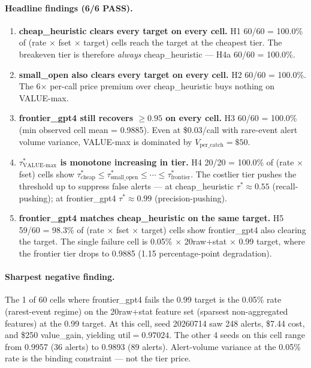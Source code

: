 \documentclass{article}
\begin{document}
\paragraph{Headline findings (6/6 PASS).}
\begin{enumerate}
\item \textbf{cheap\_heuristic clears every target on every cell.}
H1 60/60 = 100.0\% of (rate $\times$ fset $\times$ target) cells reach
the target at the cheapest tier. The breakeven tier is therefore
\emph{always} cheap\_heuristic — H4a 60/60 = 100.0\%.
\item \textbf{small\_open also clears every target on every cell.}
H2 60/60 = 100.0\%. The 6$\times$ per-call price premium over
cheap\_heuristic buys nothing on VALUE-max.
\item \textbf{frontier\_gpt4 still recovers $\geq 0.95$ on every cell.}
H3 60/60 = 100.0\% (min observed cell mean = 0.9885). Even at \$0.03/call
with rare-event alert volume variance, VALUE-max is dominated by
$V_{\text{per\_catch}} = \$50$.
\item \textbf{$\tau^*_{\text{VALUE-max}}$ is monotone increasing in tier.}
H4 20/20 = 100.0\% of (rate $\times$ fset) cells show
$\tau^*_{\text{cheap}} \leq \tau^*_{\text{small\_open}} \leq \cdots \leq
\tau^*_{\text{frontier}}$. The costlier tier pushes the threshold up
to suppress false alerts — at cheap\_heuristic $\tau^* \approx 0.55$
(recall-pushing); at frontier\_gpt4 $\tau^* \approx 0.99$
(precision-pushing).
\item \textbf{frontier\_gpt4 matches cheap\_heuristic on the same target.}
H5 59/60 = 98.3\% of (rate $\times$ fset $\times$ target) cells show
frontier\_gpt4 also clearing the target. The single failure cell is
0.05\% $\times$ 20raw+stat $\times$ 0.99 target, where the
frontier tier drops to 0.9885 (1.15 percentage-point degradation).
\end{enumerate}

\paragraph{Sharpest negative finding.}
The 1 of 60 cells where frontier\_gpt4 fails the 0.99 target is the
0.05\% rate (rarest-event regime) on the 20raw+stat feature set
(sparsest non-aggregated features) at the 0.99 target. At this cell,
seed 20260714 saw 248 alerts, \$7.44 cost, and \$250 value\_gain, yielding
$\mathrm{util} = 0.97024$. The other 4 seeds on this cell range from
0.9957 (36 alerts) to 0.9893 (89 alerts). Alert-volume variance
at the 0.05\% rate is the binding constraint — not the tier price.
\end{document}
